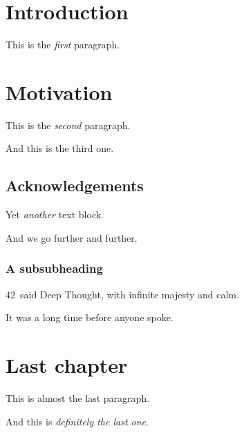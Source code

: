 \documentclass{article}
\begin{document}
\section{Introduction}

This is the \emph{first} paragraph.

\section{Motivation}

This is the \emph{second} paragraph.

And this is the third one.

\subsection{Acknowledgements}

Yet \emph{another} text block.

And we go further and further.

\subsubsection{A subsubheading}

 42\ said Deep Thought, with infinite majesty and calm.

It was a long time before anyone spoke.

\section{Last chapter}

This is almost the last paragraph.

And this is \emph{definitely the last one}.
\end{document}
